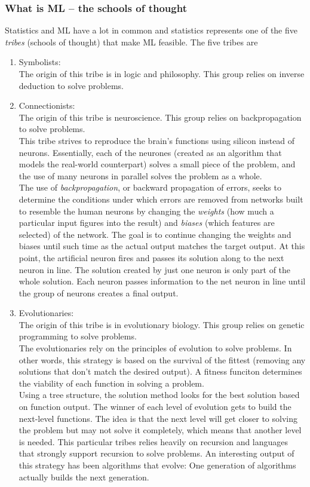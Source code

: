 \subsubsection{What is ML -- the schools of thought}
Statistics and ML have a lot in common and statistics represents one of the five \emph{tribes} (schools of thought) that make ML feasible. The five tribes are
\begin{enumerate}
	\item Symbolists:\\
	The origin of this tribe is in logic and philosophy. This group relies on inverse deduction to solve problems.
	\item Connectionists:\\
	The origin of this tribe is neuroscience. This group relies on backpropagation to solve problems.\\
	This tribe strives to reproduce the brain's functions using silicon instead of neurons. Essentially, each of the neurones (created as an algorithm that models the real-world counterpart) solves a small piece of the problem, and the use of many neurons in parallel solves the problem as a whole.\\
	The use of \emph{backpropagation}, or backward propagation of errors, seeks to determine the conditions under which errors are removed from networks built to resemble the human neurons by changing the \emph{weights} (how much a particular input figures into the result) and \emph{biases} (which features are selected) of the network. The goal is to continue changing the weights and biases until such time as the actual output matches the target output. At this point, the artificial neuron fires and passes its solution along to the next neuron in line. The solution created by just one neuron is only part of the whole solution. Each neuron passes information to the net neuron in line until the group of neurons creates a final output.
	\item Evolutionaries: \\
	The origin of this tribe is in evolutionary biology. This group relies on genetic programming to solve problems.\\
	The evolutionaries rely on the principles of evolution to solve problems. In other words, this strategy is based on the survival of the fittest (removing any solutions that don't match the desired output). A fitness funciton determines the viability of each function in solving a problem.\\
	Using a tree structure, the solution method looks for the best solution based on function output. The winner of each level of evolution gets to build the next-level functions. The idea is that the next level will get closer to solving the problem but may not solve it completely, which means that another level is needed. This particular tribes relies heavily on recursion and languages that strongly support recursion to solve problems. An interesting output of this strategy has been algorithms that evolve: One generation of algorithms actually builds the next generation.

\end{enumerate}
